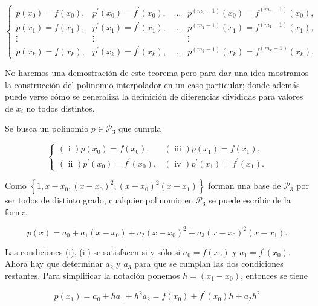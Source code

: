 \documentclass[10pt]{article}
\begin{document}
$$
\left\{\begin{array}{cccc}
p\left(x_{0}\right)=f\left(x_{0}\right), & p^{\prime}\left(x_{0}\right)=f^{\prime}\left(x_{0}\right), & \ldots & p^{\left(m_{0}-1\right)}\left(x_{0}\right)=f^{\left(m_{0}-1\right)}\left(x_{0}\right), \\
p\left(x_{1}\right)=f\left(x_{1}\right), & p^{\prime}\left(x_{1}\right)=f^{\prime}\left(x_{1}\right), & \ldots & p^{\left(m_{1}-1\right)}\left(x_{1}\right)=f^{\left(m_{1}-1\right)}\left(x_{1}\right), \\
\vdots & \vdots & & \vdots \\
p\left(x_{k}\right)=f\left(x_{k}\right), & p^{\prime}\left(x_{k}\right)=f^{\prime}\left(x_{k}\right), & \ldots & p^{\left(m_{k}-1\right)}\left(x_{k}\right)=f^{\left(m_{k}-1\right)}\left(x_{k}\right) .
\end{array}\right.
$$

No haremos una demostración de este teorema pero para dar una idea mostramos la construcción del polinomio interpolador en un caso particular; donde además puede verse cómo se generaliza la definición de diferencias divididas para valores de $x_{i}$ no todos distintos.

Se busca un polinomio $p \in \mathcal{P}_{3}$ que cumpla

$$
\begin{cases}(\text { i }) p\left(x_{0}\right)=f\left(x_{0}\right), & (\text { iii }) p\left(x_{1}\right)=f\left(x_{1}\right), \\ (\text { ii }) p^{\prime}\left(x_{0}\right)=f^{\prime}\left(x_{0}\right), & (\text { iv }) p^{\prime}\left(x_{1}\right)=f^{\prime}\left(x_{1}\right) .\end{cases}
$$

Como $\left\{1, x-x_{0},\left(x-x_{0}\right)^{2},\left(x-x_{0}\right)^{2}\left(x-x_{1}\right)\right\}$ forman una base de $\mathcal{P}_{3}$ por ser todos de distinto grado, cualquier polinomio en $\mathcal{P}_{3}$ se puede escribir de la forma

$$
p(x)=a_{0}+a_{1}\left(x-x_{0}\right)+a_{2}\left(x-x_{0}\right)^{2}+a_{3}\left(x-x_{0}\right)^{2}\left(x-x_{1}\right) .
$$

Las condiciones (i), (ii) se satisfacen si y sólo si $a_{0}=f\left(x_{0}\right)$ y $a_{1}=f^{\prime}\left(x_{0}\right)$. Ahora hay que determinar $a_{2}$ y $a_{3}$ para que se cumplan las dos condiciones restantes. Para simplificar la notación ponemos $h=\left(x_{1}-x_{0}\right)$, entonces se tiene

$$
p\left(x_{1}\right)=a_{0}+h a_{1}+h^{2} a_{2}=f\left(x_{0}\right)+f^{\prime}\left(x_{0}\right) h+a_{2} h^{2}
$$
\end{document}
